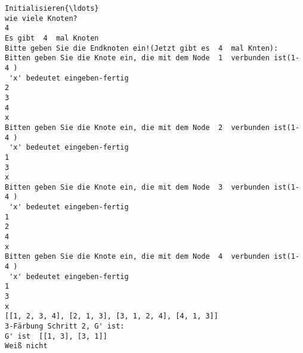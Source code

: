 \documentclass[11pt]{article}
\begin{document}
    \begin{Verbatim}[commandchars=\\\{\}]
Initialisieren{\ldots}
wie viele Knoten?
4
Es gibt  4  mal Knoten
Bitte geben Sie die Endknoten ein!(Jetzt gibt es  4  mal Knten):
Bitten geben Sie die Knote ein, die mit dem Node  1  verbunden ist(1- 4 )
 'x' bedeutet eingeben-fertig
2
3
4
x
Bitten geben Sie die Knote ein, die mit dem Node  2  verbunden ist(1- 4 )
 'x' bedeutet eingeben-fertig
1
3
x
Bitten geben Sie die Knote ein, die mit dem Node  3  verbunden ist(1- 4 )
 'x' bedeutet eingeben-fertig
1
2
4
x
Bitten geben Sie die Knote ein, die mit dem Node  4  verbunden ist(1- 4 )
 'x' bedeutet eingeben-fertig
1
3
x
[[1, 2, 3, 4], [2, 1, 3], [3, 1, 2, 4], [4, 1, 3]]
3-Färbung Schritt 2, G' ist:
G' ist  [[1, 3], [3, 1]]
Weiß nicht
    \end{Verbatim}
\end{document}
